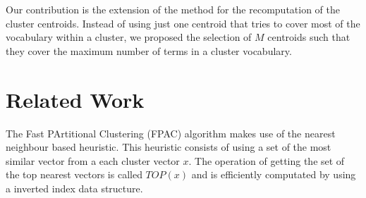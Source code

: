 \documentclass[runningheads]{llncs}
\begin{document}
Our contribution is the extension of the method for the recomputation of  the cluster centroids. Instead of using just one centroid that tries to
cover most of the vocabulary within a cluster, we proposed the selection
of $M$ centroids such that they cover the maximum number of terms 
in a cluster vocabulary.










%
%
%
%
%
%

\section{Related Work}

The Fast PArtitional Clustering (FPAC) algorithm makes use of the
nearest neighbour based heuristic. This heuristic consists of using
a set of the most similar vector from a each cluster vector $x$. 
The operation of getting the set of the top nearest vectors 
is called $TOP(x)$ and is efficiently computated by using a 
inverted index data structure.
\end{document}
